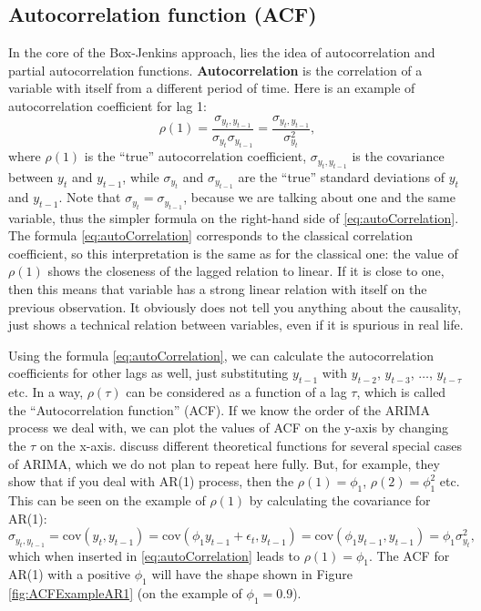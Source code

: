 \documentclass[
]{book}
\theoremstyle{definition}
\theoremstyle{definition}
\theoremstyle{definition}
\theoremstyle{definition}
\theoremstyle{remark}
\begin{document}
\hypertarget{ACF}{%
\subsection{Autocorrelation function (ACF)}\label{ACF}}

In the core of the Box-Jenkins approach, lies the idea of autocorrelation and partial autocorrelation functions. \textbf{Autocorrelation} is the correlation \citep[see Section 6.3 of][]{SvetunkovSBA} of a variable with itself from a different period of time. Here is an example of autocorrelation coefficient for lag 1:
\begin{equation}
  \rho(1) = \frac{\sigma_{y_t,y_{t-1}}}{\sigma_{y_t}\sigma_{y_{t-1}}} = \frac{\sigma_{y_t,y_{t-1}}}{\sigma_{y_t}^2},
  \label{eq:autoCorrelation}
\end{equation}
where \(\rho(1)\) is the ``true'' autocorrelation coefficient, \(\sigma_{y_t,y_{t-1}}\) is the covariance between \(y_t\) and \(y_{t-1}\), while \(\sigma_{y_t}\) and \(\sigma_{y_{t-1}}\) are the ``true'' standard deviations of \(y_t\) and \(y_{t-1}\). Note that \(\sigma_{y_t}=\sigma_{y_{t-1}}\), because we are talking about one and the same variable, thus the simpler formula on the right-hand side of \eqref{eq:autoCorrelation}. The formula \eqref{eq:autoCorrelation} corresponds to the classical correlation coefficient, so this interpretation is the same as for the classical one: the value of \(\rho(1)\) shows the closeness of the lagged relation to linear. If it is close to one, then this means that variable has a strong linear relation with itself on the previous observation. It obviously does not tell you anything about the causality, just shows a technical relation between variables, even if it is spurious in real life.

Using the formula \eqref{eq:autoCorrelation}, we can calculate the autocorrelation coefficients for other lags as well, just substituting \(y_{t-1}\) with \(y_{t-2}\), \(y_{t-3}\), \(\dots\), \(y_{t-\tau}\) etc. In a way, \(\rho(\tau)\) can be considered as a function of a lag \(\tau\), which is called the ``Autocorrelation function'' (ACF). If we know the order of the ARIMA process we deal with, we can plot the values of ACF on the y-axis by changing the \(\tau\) on the x-axis. \citet{Box1976} discuss different theoretical functions for several special cases of ARIMA, which we do not plan to repeat here fully. But, for example, they show that if you deal with AR(1) process, then the \(\rho(1)=\phi_1\), \(\rho(2)=\phi_1^2\) etc. This can be seen on the example of \(\rho(1)\) by calculating the covariance for AR(1):
\begin{equation}
  \sigma_{y_t,y_{t-1}} = \mathrm{cov}(y_t,y_{t-1}) = \mathrm{cov}(\phi_1 y_{t-1} + \epsilon_t, y_{t-1}) = \mathrm{cov}(\phi_1 y_{t-1}, y_{t-1}) = \phi_1 \sigma_{y_t}^2 ,
  \label{eq:autoCovarianceAR1}
\end{equation}
which when inserted in \eqref{eq:autoCorrelation} leads to \(\rho(1)=\phi_1\). The ACF for AR(1) with a positive \(\phi_1\) will have the shape shown in Figure \ref{fig:ACFExampleAR1} (on the example of \(\phi_1=0.9\)).
\end{document}
